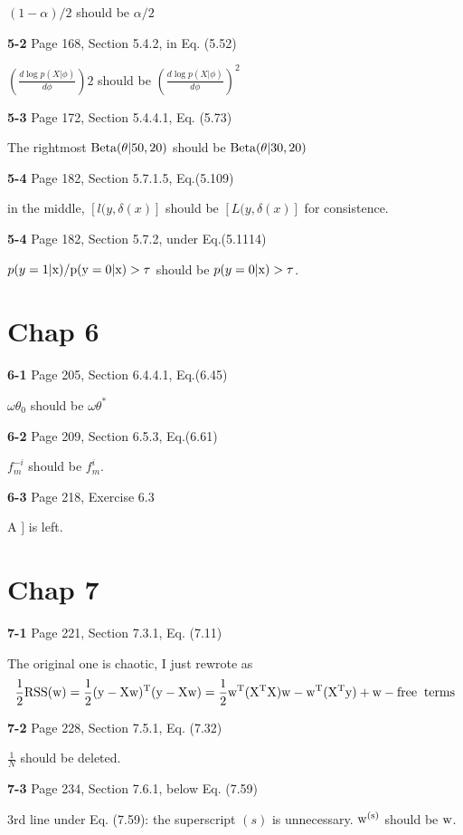 \documentclass[aps,preprint,a4]{revtex4-1}
\newcommand{\nl}{\nonumber \\}
\begin{document}
$(1-\alpha)/2$ should be $\alpha/2$

{\color{red}\textbf{5-2}} Page 168, Section 5.4.2, in Eq. (5.52)

$\left(\frac{d\log p(X|\phi)}{d\phi}\right)2$ should be
$\left(\frac{d\log p(X|\phi)}{d\phi}\right)^{2}$ 

{\color{red}\textbf{5-3}} Page 172, Section 5.4.4.1, Eq. (5.73)

The rightmost $\rm Beta(\theta|50,20)$ should be
$\rm Beta(\theta|30,20)$

{\color{red}\textbf{5-4}} Page 182, Section 5.7.1.5, Eq.(5.109)

in the middle, $[l(y,\delta(x)]$ should be $[L(y,\delta(x)]$ for consistence.

{\color{red}\textbf{5-4}} Page 182, Section 5.7.2, under Eq.(5.1114)

$p(y=1|\rm x)/p(y=0|\rm x)>\tau$ should be $p(y=0|\rm x)>\tau$.

\section{Chap 6}
{\color{red}\textbf{6-1}} Page 205, Section 6.4.4.1, Eq.(6.45)

$\omega\theta_{0}$ should be $\omega\theta^{*}$

{\color{red}\textbf{6-2}} Page 209, Section 6.5.3, Eq.(6.61)

$f^{-i}_{m}$ should be $f^{i}_{m}$.

{\color{red}\textbf{6-3}} Page 218, Exercise 6.3

A $]$ is left.


\section{Chap 7}
{\color{red}\textbf{7-1}} Page 221, Section 7.3.1, Eq. (7.11)

The original one is chaotic, I just rewrote as
\begin{equation}
\frac{1}{2} \rm RSS(w) = \frac{1}{2}(y-Xw)^{T}(y-Xw) = \frac{1}{2}w^{T}(X^{T}X)w
-w^{T}(X^{T}y) + \rm{w-free \;\; terms}\nl
\end{equation}

{\color{red}\textbf{7-2}} Page 228, Section 7.5.1, Eq. (7.32)

$\frac{1}{N}$ should be deleted.

{\color{red}\textbf{7-3}} Page 234, Section 7.6.1, below Eq. (7.59)

3rd line under Eq. (7.59): the superscript $(s)$ is unnecessary. $\rm w^{(s)}$ should
be $\rm w$.
\end{document}
